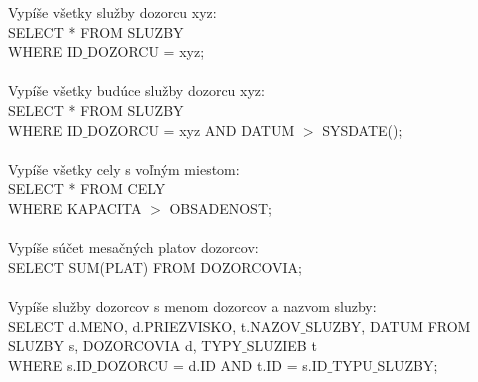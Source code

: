 \documentclass[slovak, 12pt, Times New Roman]{article}
\begin{document}
				Vypíše všetky služby dozorcu xyz:\\
				SELECT * FROM SLUZBY \\ WHERE ID$\_$DOZORCU = xyz;\\ \\
				Vypíše všetky budúce služby dozorcu xyz:\\
				SELECT * FROM SLUZBY \\ WHERE ID$\_$DOZORCU = xyz AND DATUM $>$ SYSDATE();\\ \\
				Vypíše všetky cely s voľným miestom:\\
				SELECT * FROM CELY \\ WHERE KAPACITA $>$ OBSADENOST;\\ \\
				Vypíše súčet mesačných platov dozorcov:\\
				SELECT SUM(PLAT) FROM DOZORCOVIA;\\ \\
				Vypíše služby dozorcov s menom dozorcov a nazvom sluzby:\\
				SELECT d.MENO, d.PRIEZVISKO, t.NAZOV$\_$SLUZBY, DATUM FROM SLUZBY s, DOZORCOVIA d, TYPY$\_$SLUZIEB t \\ WHERE s.ID$\_$DOZORCU = d.ID AND t.ID = s.ID$\_$TYPU$\_$SLUZBY;\\ \\
\end{document}
